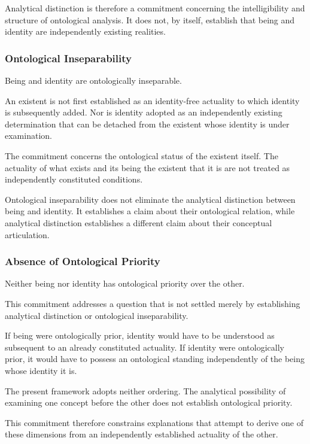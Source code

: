 Analytical distinction is therefore a commitment concerning
the intelligibility and structure of ontological analysis.
It does not, by itself, establish that being and identity
are independently existing realities.

\subsubsection{Ontological Inseparability}

Being and identity are ontologically inseparable.

An existent is not first established as an identity-free
actuality to which identity is subsequently added. Nor is
identity adopted as an independently existing determination
that can be detached from the existent whose identity is
under examination.

The commitment concerns the ontological status of the
existent itself. The actuality of what exists and its being
the existent that it is are not treated as independently
constituted conditions.

Ontological inseparability does not eliminate the analytical
distinction between being and identity. It establishes a
claim about their ontological relation, while analytical
distinction establishes a different claim about their
conceptual articulation.

\subsubsection{Absence of Ontological Priority}

Neither being nor identity has ontological priority over
the other.

This commitment addresses a question that is not settled
merely by establishing analytical distinction or ontological
inseparability.

If being were ontologically prior, identity would have
to be understood as subsequent to an already constituted
actuality. If identity were ontologically prior, it would
have to possess an ontological standing independently
of the being whose identity it is.

The present framework adopts neither ordering. The
analytical possibility of examining one concept before
the other does not establish ontological priority.

This commitment therefore constrains explanations that
attempt to derive one of these dimensions from an
independently established actuality of the other.

